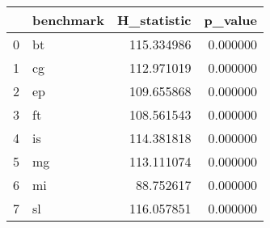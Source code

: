 \begin{tabular}{llrr}
\toprule
 & benchmark & H_statistic & p_value \\
\midrule
0 & bt & 115.334986 & 0.000000 \\
1 & cg & 112.971019 & 0.000000 \\
2 & ep & 109.655868 & 0.000000 \\
3 & ft & 108.561543 & 0.000000 \\
4 & is & 114.381818 & 0.000000 \\
5 & mg & 113.111074 & 0.000000 \\
6 & mi & 88.752617 & 0.000000 \\
7 & sl & 116.057851 & 0.000000 \\
\bottomrule
\end{tabular}
